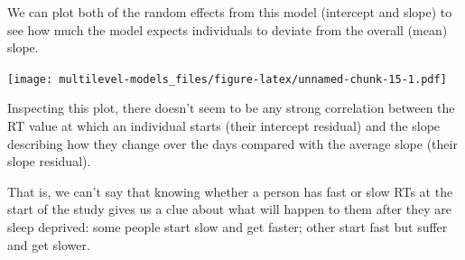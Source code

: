 \documentclass[]{article}
\newenvironment{Shaded}{\begin{snugshade}}{\end{snugshade}}
\newcommand{\CommentTok}[1]{\textcolor[rgb]{0.56,0.35,0.01}{\textit{#1}}}
\newcommand{\DataTypeTok}[1]{\textcolor[rgb]{0.13,0.29,0.53}{#1}}
\newcommand{\DecValTok}[1]{\textcolor[rgb]{0.00,0.00,0.81}{#1}}
\newcommand{\KeywordTok}[1]{\textcolor[rgb]{0.13,0.29,0.53}{\textbf{#1}}}
\newcommand{\NormalTok}[1]{#1}
\newcommand{\OperatorTok}[1]{\textcolor[rgb]{0.81,0.36,0.00}{\textbf{#1}}}
\newcommand{\StringTok}[1]{\textcolor[rgb]{0.31,0.60,0.02}{#1}}
\begin{document}
We can plot both of the random effects from this model (intercept and slope) to
see how much the model expects individuals to deviate from the overall (mean)
slope.

\begin{Shaded}
\end{Shaded}

\texttt{[image: multilevel-models\_files/figure-latex/unnamed-chunk-15-1.pdf]}

Inspecting this plot, there doesn't seem to be any strong correlation between
the RT value at which an individual starts (their intercept residual) and the
slope describing how they change over the days compared with the average slope
(their slope residual).

That is, we can't say that knowing whether a person has fast or slow RTs at the
start of the study gives us a clue about what will happen to them after they are
sleep deprived: some people start slow and get faster; other start fast but
suffer and get slower.
\end{document}
